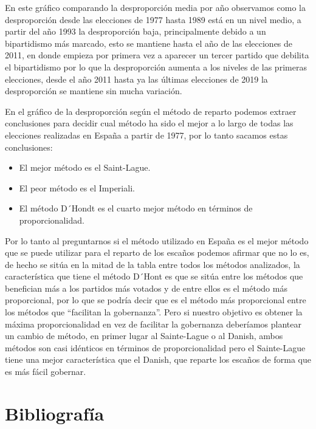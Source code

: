 \documentclass[12pt,a4paper,]{book}
\def\ifdoblecara{} %
\def\ifcitapandoc{} %
\let\ifcitapandoc\undefined %
\providecommand{\tightlist}{%
  \setlength{\itemsep}{0pt}\setlength{\parskip}{0pt}}
\numberwithin{dummy}{section}
\theoremstyle{ocrenumbox}
\theoremstyle{blacknumex}
\theoremstyle{blacknumbox}
\theoremstyle{ocrenum}
\theoremstyle{ocrenum}
\begin{document}
En este gráfico comparando la desproporción media por año observamos
como la desproporción desde las elecciones de 1977 hasta 1989 está en un
nivel medio, a partir del año 1993 la desproporción baja, principalmente
debido a un bipartidismo más marcado, esto se mantiene hasta el año de
las elecciones de 2011, en donde empieza por primera vez a aparecer un
tercer partido que debilita el bipartidismo por lo que la desproporción
aumenta a los niveles de las primeras elecciones, desde el año 2011
hasta ya las últimas elecciones de 2019 la desproporción se mantiene sin
mucha variación.

En el gráfico de la desproporción según el método de reparto podemos
extraer conclusiones para decidir cual método ha sido el mejor a lo
largo de todas las elecciones realizadas en España a partir de 1977, por
lo tanto sacamos estas conclusiones:

\begin{itemize}
\tightlist
\item
  El mejor método es el Saint-Lague.
\item
  El peor método es el Imperiali.
\item
  El método D´Hondt es el cuarto mejor método en términos de
  proporcionalidad.
\end{itemize}

Por lo tanto al preguntarnos si el método utilizado en España es el
mejor método que se puede utilizar para el reparto de los escaños
podemos afirmar que no lo es, de hecho se sitúa en la mitad de la tabla
entre todos los métodos analizados, la característica que tiene el
método D´Hont es que se sitúa entre los métodos que benefician más a los
partidos más votados y de entre ellos es el método más proporcional, por
lo que se podría decir que es el método más proporcional entre los
métodos que ``facilitan la gobernanza''. Pero si nuestro objetivo es
obtener la máxima proporcionalidad en vez de facilitar la gobernanza
deberíamos plantear un cambio de método, en primer lugar al Sainte-Lague
o al Danish, ambos métodos son casi idénticos en términos de
proporcionalidad pero el Sainte-Lague tiene una mejor característica que
el Danish, que reparte los escaños de forma que es más fácil gobernar.

\FloatBarrier
\cleardoublepage

\ifdefined\ifdoblecara
  \fancyhead[LE,RO]{}
  \fancyfoot[LO,RE]{}
\else
  \fancyhead[RO]{}
  \fancyfoot[LO]{}
\fi

\ifdefined\ifcitapandoc

\hypertarget{bibliografuxeda}{%
\chapter*{Bibliografía}\label{bibliografuxeda}}

\else

\nocite{*}

\fi




\end{document}
